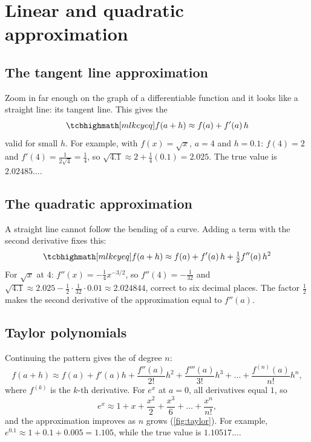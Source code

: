 \section{Linear and quadratic approximation}\label{sec:taylor-1d}

\subsection{The tangent line approximation}

Zoom in far enough on the graph of a differentiable function and it looks like
a straight line: its tangent line. This gives the 
\[
  \keyeq{f(a + h) \approx f(a) + f'(a)\,h}
\]
valid for small $h$. For example, with $f(x) = \sqrt x$, $a = 4$ and $h = 0.1$:
$f(4) = 2$ and $f'(4) = \frac{1}{2\sqrt4} = \frac14$, so
$\sqrt{4.1} \approx 2 + \frac14(0.1) = 2.025$. The true value is
$2.02485\ldots$.

\subsection{The quadratic approximation}

A straight line cannot follow the bending of a curve. Adding a term with the
second derivative fixes this:
\[
  \keyeq{f(a + h) \approx f(a) + f'(a)\,h + \tfrac12 f''(a)\,h^2}
\]
For $\sqrt x$ at $4$: $f''(x) = -\frac14x^{-3/2}$, so $f''(4) = -\frac{1}{32}$
and $\sqrt{4.1} \approx 2.025 - \frac12\cdot\frac{1}{32}\cdot0.01 \approx
2.024844$, correct to six decimal places. The factor $\frac12$ makes the
second derivative of the approximation equal to $f''(a)$.

\subsection{Taylor polynomials}

Continuing the pattern gives the  of degree $n$:
\[
  f(a + h) \approx f(a) + f'(a)h + \frac{f''(a)}{2!}h^2 + \frac{f'''(a)}{3!}h^3
  + \dots + \frac{f^{(n)}(a)}{n!}h^n ,
\]
where $f^{(k)}$ is the $k$-th derivative. For $e^x$ at $a = 0$, all derivatives
equal $1$, so
\[
  e^x \approx 1 + x + \frac{x^2}{2} + \frac{x^3}{6} + \dots + \frac{x^n}{n!} ,
\]
and the approximation improves as $n$ grows (\cref{fig:taylor}). For example,
$e^{0.1} \approx 1 + 0.1 + 0.005 = 1.105$, while the true value is
$1.10517\ldots$.

